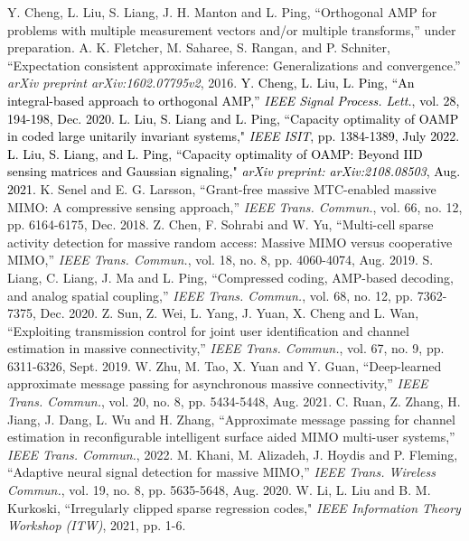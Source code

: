 \documentclass[journal]{IEEEtran}
\newcommand{\LL}[1]{\textcolor{black}{#1}}
\begin{document}
\begin{thebibliography}{1}
Y. Cheng, L. Liu, S. Liang, J. H. Manton and L. Ping, ``Orthogonal AMP for problems with multiple measurement vectors and/or multiple transforms,''  under preparation.
A. K. Fletcher, M. Saharee, S. Rangan, and P. Schniter, ``Expectation consistent approximate inference: Generalizations and convergence.'' \textit{arXiv preprint arXiv:1602.07795v2}, 2016. 
\LL{
  Y. Cheng, L. Liu, L. Ping, ``An integral-based approach to orthogonal AMP,'' \textit{IEEE Signal Process. Lett.}, vol. 28, 194-198, Dec. 2020.
  \bibitem{OAMP_ISIT22}
L. Liu, S. Liang and L. Ping, ``Capacity optimality of OAMP in coded large unitarily invariant systems," \textit{IEEE ISIT}, pp. 1384-1389, July 2022.
 \bibitem{OAMP_TCOM}
 L. Liu, S. Liang, and L. Ping, ``Capacity optimality of OAMP: Beyond IID sensing matrices and Gaussian signaling," \textit{arXiv preprint: arXiv:2108.08503}, Aug. 2021.}
K. Senel and E. G. Larsson, ``Grant-free massive MTC-enabled massive MIMO: A compressive sensing approach,'' \textit{IEEE Trans. Commun.}, vol. 66, no. 12, pp. 6164-6175, Dec. 2018.
Z. Chen, F. Sohrabi and W. Yu, ``Multi-cell sparse activity detection for massive random access: Massive MIMO versus cooperative MIMO,'' \textit{IEEE Trans. Commun.}, vol. 18, no. 8, pp. 4060-4074, Aug. 2019.
S. Liang, C. Liang, J. Ma and L. Ping, ``Compressed coding, AMP-based decoding, and analog spatial coupling,'' \textit{IEEE Trans. Commun.}, vol. 68, no. 12, pp. 7362-7375, Dec. 2020.
Z. Sun, Z. Wei, L. Yang, J. Yuan, X. Cheng and L. Wan, ``Exploiting transmission control for joint user identification and channel estimation in massive connectivity,'' \textit{IEEE Trans. Commun.}, vol. 67, no. 9, pp. 6311-6326, Sept. 2019.
W. Zhu, M. Tao, X. Yuan and Y. Guan, ``Deep-learned approximate message passing for asynchronous massive connectivity,'' \textit{IEEE Trans. Commun.}, vol. 20, no. 8, pp. 5434-5448, Aug. 2021.
C. Ruan, Z. Zhang, H. Jiang, J. Dang, L. Wu and H. Zhang, ``Approximate message passing for channel estimation in reconfigurable intelligent surface aided MIMO multi-user systems,'' \textit{IEEE Trans. Commun.}, 2022. 
M. Khani, M. Alizadeh, J. Hoydis and P. Fleming, ``Adaptive neural signal detection for massive MIMO,'' \textit{IEEE Trans. Wireless Commun.}, vol. 19, no. 8, pp. 5635-5648, Aug. 2020.
W. Li, L. Liu and B. M. Kurkoski, ``Irregularly clipped sparse regression codes," \textit{IEEE Information Theory Workshop (ITW)}, 2021, pp. 1-6.

\end{thebibliography}
\end{document}
